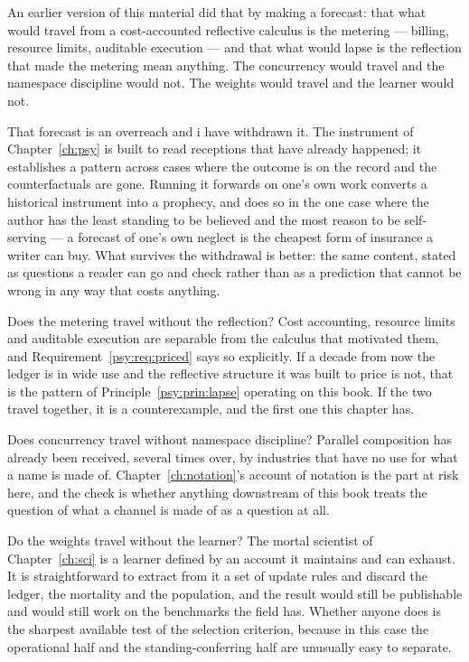 An earlier version of this material did that by making a forecast:
that what would travel from a cost-accounted reflective calculus is
the metering --- billing, resource limits, auditable execution ---
and that what would lapse is the reflection that made the metering
mean anything.
The concurrency would travel and the namespace discipline would not.
The weights would travel and the learner would not.

That forecast is an overreach and i have withdrawn it.
The instrument of Chapter~\ref{ch:psy} is built to read receptions
that have already happened; it establishes a pattern across cases
where the outcome is on the record and the counterfactuals are
gone.
Running it forwards on one's own work converts a historical
instrument into a prophecy, and does so in the one case where the
author has the least standing to be believed and the most reason to
be self-serving --- a forecast of one's own neglect is the cheapest
form of insurance a writer can buy.
What survives the withdrawal is better: the same content, stated as
questions a reader can go and check rather than as a prediction that
cannot be wrong in any way that costs anything.

\begin{question}
\label{psy:q:metering}
Does the metering travel without the reflection?
Cost accounting, resource limits and auditable execution are
separable from the calculus that motivated them, and
Requirement~\ref{psy:req:priced} says so explicitly.
If a decade from now the ledger is in wide use and the reflective
structure it was built to price is not, that is the pattern of
Principle~\ref{psy:prin:lapse} operating on this book.
If the two travel together, it is a counterexample, and the first
one this chapter has.
\end{question}

\begin{question}
\label{psy:q:concurrency}
Does concurrency travel without namespace discipline?
Parallel composition has already been received, several times over,
by industries that have no use for what a name is made of.
Chapter~\ref{ch:notation}'s account of notation is the part at risk
here, and the check is whether anything downstream of this book
treats the question of what a channel is made of as a question at
all.
\end{question}

\begin{question}
\label{psy:q:learner}
Do the weights travel without the learner?
The mortal scientist of Chapter~\ref{ch:sci} is a learner defined by
an account it maintains and can exhaust.
It is straightforward to extract from it a set of update rules and
discard the ledger, the mortality and the population, and the result
would still be publishable and would still work on the benchmarks
the field has.
Whether anyone does is the sharpest available test of the
selection criterion, because in this case the operational half and
the standing-conferring half are unusually easy to separate.
\end{question}

